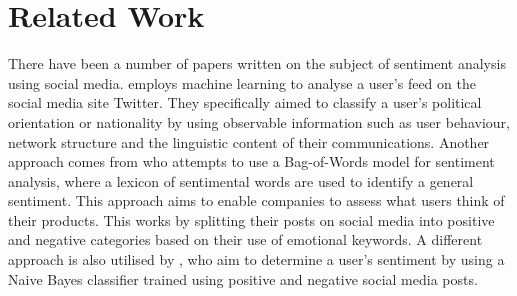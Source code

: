 \section{Related Work} There have been a number of papers written on
the subject of sentiment analysis using social media.
 employs machine learning to analyse a
user's feed on the social media site Twitter. They specifically aimed to
classify a user's political orientation or nationality by using observable
information such as user behaviour, network structure and the linguistic content
of their communications. Another approach comes from  who
attempts to use a Bag-of-Words model for sentiment analysis, where a lexicon of
sentimental words are used to identify a general sentiment.
This approach aims to enable companies to assess what users think of their
products. This works by splitting their posts on social media into positive and
negative categories based on their use of emotional keywords. A different
approach is also utilised by , who aim to determine a
user's sentiment by using a Naive Bayes classifier trained using positive and
negative social media posts.